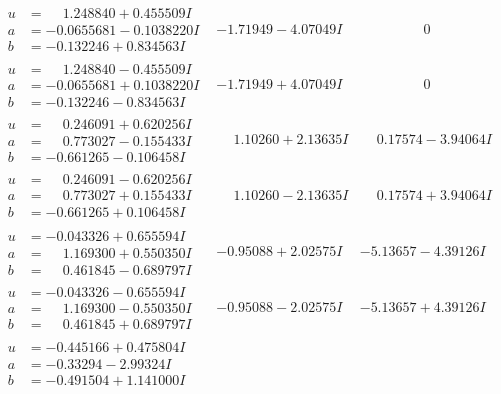 \documentclass[1p]{elsarticle_modified}
\theoremstyle{definition}
\begin{document}
$$\begin{array}{c|c|c}
\begin{aligned}
u &= \phantom{-}1.248840 + 0.455509 I \\
a &= -0.0655681 - 0.1038220 I \\
b &= -0.132246 + 0.834563 I\end{aligned}
 & -1.71949 - 4.07049 I & \phantom{-0.000000 } 0 \\ \hline\begin{aligned}
u &= \phantom{-}1.248840 - 0.455509 I \\
a &= -0.0655681 + 0.1038220 I \\
b &= -0.132246 - 0.834563 I\end{aligned}
 & -1.71949 + 4.07049 I & \phantom{-0.000000 } 0 \\ \hline\begin{aligned}
u &= \phantom{-}0.246091 + 0.620256 I \\
a &= \phantom{-}0.773027 - 0.155433 I \\
b &= -0.661265 - 0.106458 I\end{aligned}
 & \phantom{-}1.10260 + 2.13635 I & \phantom{-}0.17574 - 3.94064 I \\ \hline\begin{aligned}
u &= \phantom{-}0.246091 - 0.620256 I \\
a &= \phantom{-}0.773027 + 0.155433 I \\
b &= -0.661265 + 0.106458 I\end{aligned}
 & \phantom{-}1.10260 - 2.13635 I & \phantom{-}0.17574 + 3.94064 I \\ \hline\begin{aligned}
u &= -0.043326 + 0.655594 I \\
a &= \phantom{-}1.169300 + 0.550350 I \\
b &= \phantom{-}0.461845 - 0.689797 I\end{aligned}
 & -0.95088 + 2.02575 I & -5.13657 - 4.39126 I \\ \hline\begin{aligned}
u &= -0.043326 - 0.655594 I \\
a &= \phantom{-}1.169300 - 0.550350 I \\
b &= \phantom{-}0.461845 + 0.689797 I\end{aligned}
 & -0.95088 - 2.02575 I & -5.13657 + 4.39126 I \\ \hline\begin{aligned}
u &= -0.445166 + 0.475804 I \\
a &= -0.33294 - 2.99324 I \\
b &= -0.491504 + 1.141000 I\end{aligned}

\end{array}$$
\end{document}
